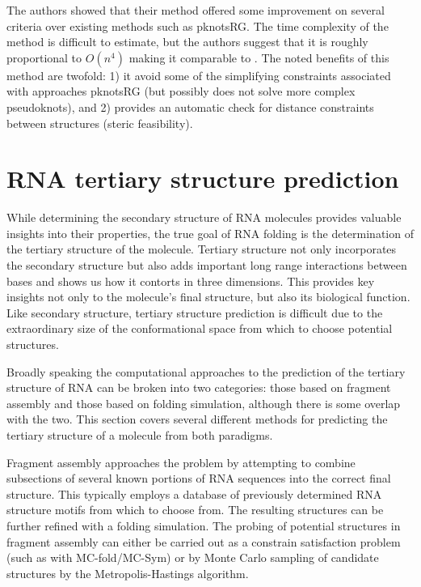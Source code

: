 \documentclass[journal]{IEEEtran}
\begin{document}
The authors showed that their method offered some improvement on several criteria over existing methods such as pknotsRG. The time complexity of the method is difficult to estimate, but the authors suggest that it is roughly proportional to $O(n^4)$ making it comparable to \cite{reeder2007pknotsrg}. The noted benefits of this method are twofold: 1) it avoid some of the simplifying constraints associated with approaches pknotsRG (but possibly does not solve more complex pseudoknots), and 2) provides an automatic check for distance constraints between structures (steric feasibility).



\section{RNA tertiary structure prediction}
\label{sec:rna-tertiary-structure}
While determining the secondary structure of RNA molecules provides valuable insights into their properties, the true goal of RNA folding is the determination of the tertiary structure of the molecule. Tertiary structure not only incorporates the secondary structure but also adds important long range interactions between bases and shows us how it contorts in three dimensions. This provides key insights not only to the molecule's final structure, but also its biological function. Like secondary structure, tertiary structure prediction is difficult due to the extraordinary size of the conformational space from which to choose potential structures. 

Broadly speaking the computational approaches to the prediction of the tertiary structure of RNA can be broken into two categories: those based on fragment assembly and those based on folding simulation, although there is some overlap with the two. This section covers several different methods for predicting the tertiary structure of a molecule from both paradigms.

Fragment assembly approaches the problem by attempting to combine subsections of several known portions of RNA sequences into the correct final structure. This typically employs a database of previously determined RNA structure motifs from which to choose from. The resulting structures can be further refined with a folding simulation. The probing of potential structures in fragment assembly can either be carried out as a constrain satisfaction problem (such as with MC-fold/MC-Sym\cite{parisien2008mc}) or by Monte Carlo sampling of candidate structures by the Metropolis-Hastings algorithm. 
\end{document}
